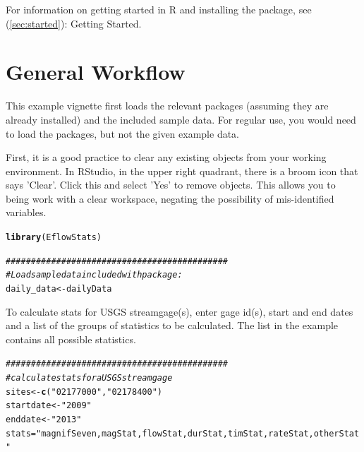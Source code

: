 \documentclass[a4paper,11pt]{article}\usepackage[]{graphicx}\usepackage[]{color}
\makeatletter
\newcommand{\hlstr}[1]{\textcolor[rgb]{0.192,0.494,0.8}{#1}}%
\newcommand{\hlcom}[1]{\textcolor[rgb]{0.678,0.584,0.686}{\textit{#1}}}%
\newcommand{\hlstd}[1]{\textcolor[rgb]{0.345,0.345,0.345}{#1}}%
\newcommand{\hlkwb}[1]{\textcolor[rgb]{0.69,0.353,0.396}{#1}}%
\newcommand{\hlkwd}[1]{\textcolor[rgb]{0.737,0.353,0.396}{\textbf{#1}}}%
\newenvironment{kframe}{%
 \def\at@end@of@kframe{}%
 \ifinner\ifhmode%
  \def\at@end@of@kframe{\end{minipage}}%
  \begin{minipage}{\columnwidth}%
 \fi\fi%
 \def\FrameCommand##1{\hskip\@totalleftmargin \hskip-\fboxsep
 \colorbox{shadecolor}{##1}\hskip-\fboxsep
     \hskip-\linewidth \hskip-\@totalleftmargin \hskip\columnwidth}%
 \MakeFramed {\advance\hsize-\width
   \@totalleftmargin\z@ \linewidth\hsize
   \@setminipage}}%
 {\par\unskip\endMakeFramed%
 \at@end@of@kframe}
\newenvironment{knitrout}{}{} %
\makeatother
\begin{document}
For information on getting started in R and installing the package, see (\ref{sec:started}): Getting Started.

\section{General Workflow}
\label{sec:exampleWorkflow}

This example vignette first loads the relevant packages (assuming they are already installed) and the included sample data. For regular use, you would need to load the packages, but not the given example data.

First, it is a good practice to clear any existing objects from your working environment. In RStudio, in the upper right quadrant, there is a broom icon that says 'Clear'. Click this and select 'Yes' to remove objects. This allows you to being work with a clear workspace, negating the possibility of mis-identified variables. 

\begin{knitrout}
\color{fgcolor}\begin{kframe}
\begin{alltt}
\hlkwd{library}\hlstd{(EflowStats)}

\hlcom{############################################}
\hlcom{# Load sample data included with package:}
\hlstd{daily_data}\hlkwb{<-}\hlstd{dailyData}
\end{alltt}
\end{kframe}
\end{knitrout}

To calculate stats for USGS streamgage(s), enter gage id(s), start and end dates and a list of the groups of statistics to be calculated. The list in the example contains all possible statistics.

\begin{knitrout}
\color{fgcolor}\begin{kframe}
\begin{alltt}
\hlcom{############################################}
\hlcom{# calculate stats for a USGS streamgage}
\hlstd{sites} \hlkwb{<-} \hlkwd{c}\hlstd{(}\hlstr{"02177000"}\hlstd{,}\hlstr{"02178400"}\hlstd{)}
\hlstd{startdate} \hlkwb{<-} \hlstr{"2009"}
\hlstd{enddate} \hlkwb{<-} \hlstr{"2013"}
\hlstd{stats}\hlkwb{=}\hlstr{"magnifSeven,magStat,flowStat,durStat,timStat,rateStat,otherStat"}
\end{alltt}
\end{kframe}
\end{knitrout}
\end{document}
